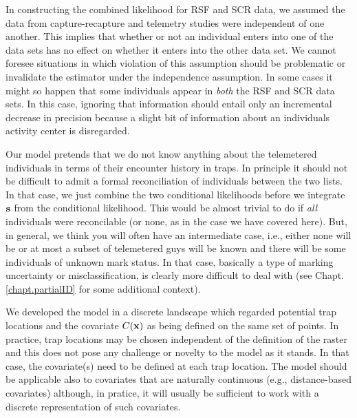 In constructing the combined likelihood for RSF and SCR data, we
assumed the data from capture-recapture and telemetry studies were
independent of one another. This implies that whether or not an
individual enters into one of the data sets has no effect on whether
it enters into the other data set.  We cannot foresee situations in
which violation of this assumption should be problematic or invalidate
the estimator under the independence assumption.  In some cases it
might so happen that some individuals appear in {\it both} the RSF and
SCR data sets. In this case, ignoring that information should entail
only an incremental decrease in precision because a slight bit of
information about an individuals activity center is disregarded.

 Our model pretends that we do not know anything
about the telemetered individuals in terms of their encounter history
in traps. In principle it should not be difficult to admit a formal
reconciliation of individuals between the two lists. In that case, we
just combine the two conditional likelihoods before we integrate ${\bf
  s}$ from the conditional likelihood. This would be almost trivial to
do if {\it all} individuals were reconcilable (or none, as in the case
we have covered here). But, in general, we think you will often have
an intermediate case, i.e., either none will be or at most a subset
of telemetered guys will be known and there will be some individuals
of unknown mark status. 
In that case, basically a type of marking uncertainty or
misclassification, is clearly more difficult to deal with 
(see
Chapt. \ref{chapt.partialID} for some additional context).

We developed the model in a discrete landscape which regarded
potential trap
locations and the covariate $C({\bf x})$ as being defined on the same
set of points. In practice, trap locations may be chosen
independent of the definition of the raster and this does not pose any
challenge or novelty to the model as it stands. In that
case, the covariate(s) need to be defined at each trap location.
The model should be applicable also to covariates that are naturally
continuous (e.g., distance-based covariates) although, in pratice, it
will usually be sufficient to work with a discrete representation of
such covariates.

